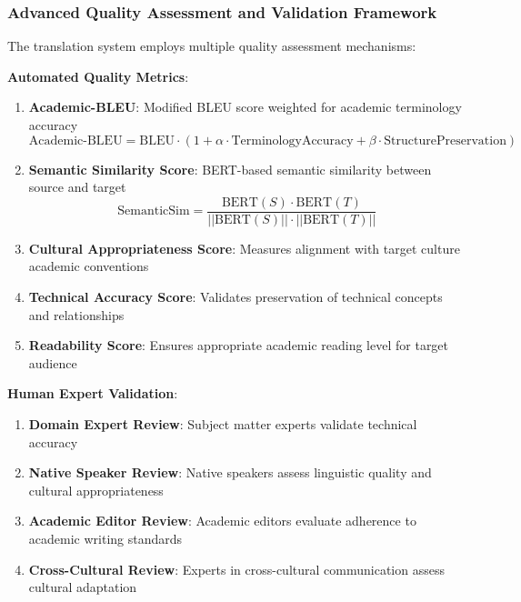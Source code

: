 \documentclass[10pt,twocolumn]{article}
\begin{document}
\subsubsection{Advanced Quality Assessment and Validation Framework}

The translation system employs multiple quality assessment mechanisms:

\textbf{Automated Quality Metrics}:

\begin{enumerate}
    \item \textbf{Academic-BLEU}: Modified BLEU score weighted for academic terminology accuracy
    \begin{equation}
    \text{Academic-BLEU} = \text{BLEU} \cdot (1 + \alpha \cdot \text{TerminologyAccuracy} + \beta \cdot \text{StructurePreservation})
    \end{equation}
    
    \item \textbf{Semantic Similarity Score}: BERT-based semantic similarity between source and target
    \begin{equation}
    \text{SemanticSim} = \frac{\text{BERT}(S) \cdot \text{BERT}(T)}{||\text{BERT}(S)|| \cdot ||\text{BERT}(T)||}
    \end{equation}
    
    \item \textbf{Cultural Appropriateness Score}: Measures alignment with target culture academic conventions
    \item \textbf{Technical Accuracy Score}: Validates preservation of technical concepts and relationships
    \item \textbf{Readability Score}: Ensures appropriate academic reading level for target audience
\end{enumerate}

\textbf{Human Expert Validation}:

\begin{enumerate}
    \item \textbf{Domain Expert Review}: Subject matter experts validate technical accuracy
    \item \textbf{Native Speaker Review}: Native speakers assess linguistic quality and cultural appropriateness
    \item \textbf{Academic Editor Review}: Academic editors evaluate adherence to academic writing standards
    \item \textbf{Cross-Cultural Review}: Experts in cross-cultural communication assess cultural adaptation
\end{enumerate}
\end{document}
